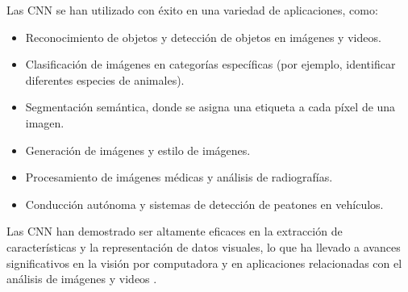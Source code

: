 \documentclass[12pt,twoside,titlepage]{ingenius}
\begin{document}
\begin{multicols}{2}
Las CNN se han utilizado con éxito en una variedad de aplicaciones, como:
\begin{itemize}
	\item Reconocimiento de objetos y detección de objetos en imágenes y videos.
	\item Clasificación de imágenes en categorías específicas (por ejemplo, identificar diferentes especies de animales).
	\item Segmentación semántica, donde se asigna una etiqueta a cada píxel de una imagen.
	\item Generación de imágenes y estilo de imágenes.
	\item Procesamiento de imágenes médicas y análisis de radiografías.
	\item Conducción autónoma y sistemas de detección de peatones en vehículos.
\end{itemize}

Las CNN han demostrado ser altamente eficaces en la extracción de características y la representación de datos visuales, lo que ha llevado a avances significativos en la visión por computadora y en aplicaciones relacionadas con el análisis de imágenes y videos \cite{10}.


\end{multicols}
\end{document}
